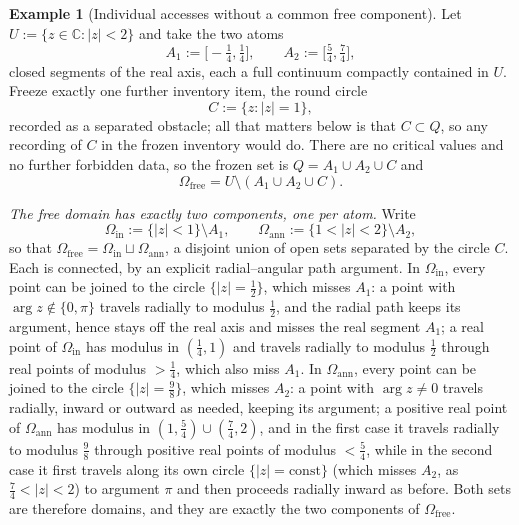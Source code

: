 \documentclass[11pt,reqno]{amsart}
\theoremstyle{definition}
\newtheorem{example}[theorem]{Example}
\theoremstyle{remark}
\newcommand{\C}{\mathbb C}
\newcommand{\Omfree}{\Omega_{\mathrm{free}}}
\begin{document}
\begin{example}[Individual accesses without a common free component]
\label{ex:no-common-component}
Let $U:=\{z\in\C:|z|<2\}$ and take the two atoms
\[
A_1:=\bigl[-\tfrac14,\tfrac14\bigr],
\qquad
A_2:=\bigl[\tfrac54,\tfrac74\bigr],
\]
closed segments of the real axis, each a full continuum compactly contained in $U$.
Freeze exactly one further inventory item, the round circle
\[
C:=\{z:|z|=1\},
\]
recorded as a separated obstacle; all that matters below is that $C\subset Q$, so any
recording of $C$ in the frozen inventory would do. There
are no critical values and no further forbidden data, so the frozen set is
$Q=A_1\cup A_2\cup C$ and
\[
\Omfree=U\setminus(A_1\cup A_2\cup C).
\]

\emph{The free domain has exactly two components, one per atom.} Write
\[
\Omega_{\mathrm{in}}:=\{|z|<1\}\setminus A_1,
\qquad
\Omega_{\mathrm{ann}}:=\{1<|z|<2\}\setminus A_2,
\]
so that $\Omfree=\Omega_{\mathrm{in}}\sqcup\Omega_{\mathrm{ann}}$, a disjoint union of
open sets separated by the circle $C$. Each is connected, by an explicit radial--angular
path argument. In $\Omega_{\mathrm{in}}$, every point can be joined to the circle
$\{|z|=\tfrac12\}$, which misses $A_1$: a point with $\arg z\notin\{0,\pi\}$ travels
radially to modulus $\tfrac12$, and the radial path keeps its argument, hence stays off
the real axis and misses the real segment $A_1$; a real point of
$\Omega_{\mathrm{in}}$ has modulus in $(\tfrac14,1)$ and travels radially to modulus
$\tfrac12$ through real points of modulus $>\tfrac14$, which also miss $A_1$. In
$\Omega_{\mathrm{ann}}$, every point can be joined to the circle $\{|z|=\tfrac98\}$,
which misses $A_2$: a point with $\arg z\neq0$ travels radially, inward or
outward as needed, keeping its
argument; a positive real point of $\Omega_{\mathrm{ann}}$ has modulus in
$(1,\tfrac54)\cup(\tfrac74,2)$, and in the first case it travels radially to
modulus $\tfrac98$ through positive real points of modulus $<\tfrac54$, while in the
second case it first travels along its own circle $\{|z|=\mathrm{const}\}$ (which
misses $A_2$, as $\tfrac74<|z|<2$) to argument $\pi$ and then proceeds radially inward
as before. Both sets are
therefore domains, and they are exactly the two components of $\Omfree$.


\end{example}
\end{document}
